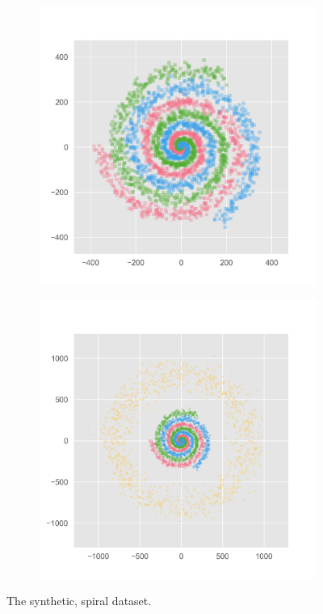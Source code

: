 \begin{figure}
    \centering
    \begin{subfigure}{0.4\textwidth}
      \centering
      \includegraphics[trim=0 0 0 0, clip, width=\linewidth]{../openreview/plots/2a.png}
      \label{fig:2a}
    \end{subfigure}
    \begin{subfigure}{0.4\textwidth}
      \centering
      \includegraphics[trim=0 0 0 0, clip, width=\linewidth]{../openreview/plots/2b.png}
      \label{fig:2b}
    \end{subfigure}
    \caption{The synthetic, spiral dataset. }
    \label{fig:2}
\end{figure}

